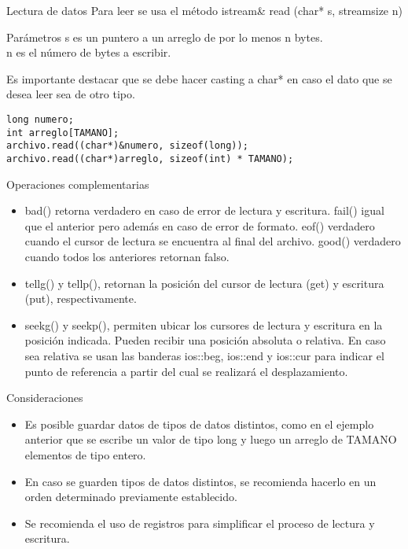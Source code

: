 \documentclass[aspectratio=169]{beamer}
\begin{document}
\begin{frame}[fragile]{Lectura de datos}
Para leer se usa el método istream\& read (char* s, streamsize n)
\begin{block}{Parámetros}
\alert{s} es un puntero a un arreglo de por lo menos n bytes.\\
\alert{n} es el número de bytes a escribir.
\end{block}
Es importante destacar que se debe hacer casting a char* en caso el dato que se
desea leer sea de otro tipo.
\begin{lstlisting}
long numero;
int arreglo[TAMANO];
archivo.read((char*)&numero, sizeof(long));
archivo.read((char*)arreglo, sizeof(int) * TAMANO);
\end{lstlisting}
\end{frame}

\begin{frame}{Operaciones complementarias}
\begin{itemize}
\item bad() retorna verdadero en caso de error de lectura y escritura. fail() igual
que el anterior pero además en caso de error de formato. eof() verdadero cuando
el cursor de lectura se encuentra al final del archivo. good() verdadero cuando
todos los anteriores retornan falso.
\item tellg() y tellp(), retornan la posición del cursor de lectura (get) y
escritura (put), respectivamente.
\item seekg() y seekp(), permiten ubicar los cursores de lectura y escritura en la
posición indicada. Pueden recibir una posición absoluta o relativa. En caso sea relativa
se usan las banderas ios::beg, ios::end y ios::cur para indicar el punto de referencia
a partir del cual se realizará el desplazamiento.
\end{itemize}
\end{frame}

\begin{frame}{Consideraciones}
\begin{itemize}
\item Es posible guardar datos de tipos de datos distintos, como en el ejemplo
anterior que se escribe un valor de tipo long y luego un arreglo de TAMANO 
elementos de tipo entero. 
\item En caso se guarden tipos de datos distintos, se recomienda hacerlo
en un orden determinado previamente establecido.
\item Se recomienda el uso de registros para simplificar el proceso de lectura
y escritura.
\end{itemize}
\end{frame}
\end{document}
